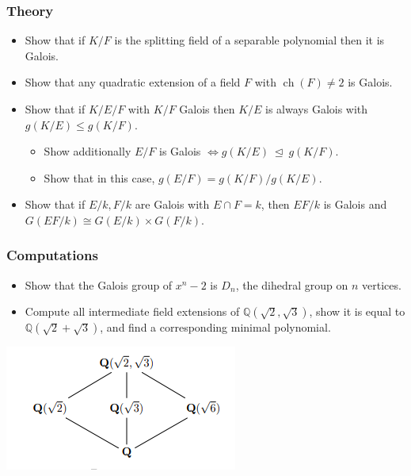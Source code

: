 \hypertarget{theory}{%
\subsubsection{Theory}\label{theory}}

\begin{itemize}
\tightlist
\item
  Show that if \(K/F\) is the splitting field of a separable polynomial
  then it is Galois.
\item
  Show that any quadratic extension of a field \(F\) with
  \(\operatorname{ch}(F)\neq 2\) is Galois.
\item
  Show that if \(K/E/F\) with \(K/F\) Galois then \(K/E\) is always
  Galois with \(g(K/E) \leq g(K/F)\).

  \begin{itemize}
  \tightlist
  \item
    Show additionally \(E/F\) is Galois
    \(\iff g(K/E) {~\trianglelefteq~}g(K/F)\).
  \item
    Show that in this case, \(g(E/F) = g(K/F) / g(K/E)\).
  \end{itemize}
\item
  Show that if \(E/k, F/k\) are Galois with \(E\cap F = k\), then
  \(EF/k\) is Galois and \(G(EF/k) \cong G(E/k)\times G(F/k)\).
\end{itemize}

\hypertarget{computations}{%
\subsubsection{Computations}\label{computations}}

\begin{itemize}
\tightlist
\item
  Show that the Galois group of \(x^n - 2\) is \(D_n\), the dihedral
  group on \(n\) vertices.
\item
  Compute all intermediate field extensions of
  \({\mathbb{Q}}(\sqrt 2, \sqrt 3)\), show it is equal to
  \({\mathbb{Q}}(\sqrt 2 + \sqrt 3)\), and find a corresponding minimal
  polynomial.
\end{itemize}

\includegraphics{figures/image_2020-06-01-20-56-35.png}

